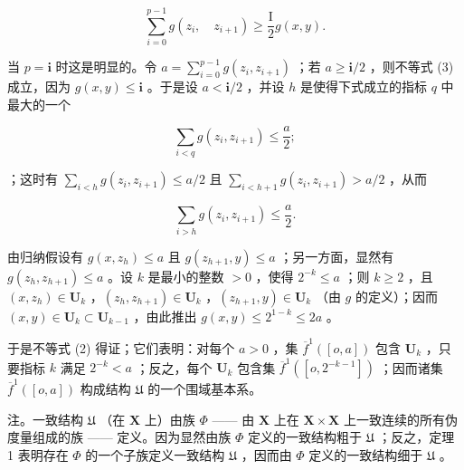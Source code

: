 \[
\sum_ {i = 0} ^ {p - 1} g (z _ {i}, \quad z _ {i + 1}) \geqslant \frac {\mathrm{I}}{2} g (x, y).\tag{3}
\]

当 \(p = \mathbf{i}\) 时这是明显的。令 \(a = \sum_{i=0}^{p-1} g(z_i, z_{i+1})\) ；若 \(a \geqslant \mathbf{i}/2\) ，则不等式 (3) 成立，因为 \(g(x, y) \leqslant \mathbf{i}\) 。于是设 \(a < \mathbf{i}/2\) ，并设 \(h\) 是使得下式成立的指标 \(q\) 中最大的一个

\[
\sum_ {i <   q} g (z _ {i}, z _ {i + 1}) \leqslant \frac {a}{2};
\]

；这时有 \(\sum_{i < h} g(z_i, z_{i+1}) \leqslant a/2\) 且 \(\sum_{i < h+1} g(z_i, z_{i+1}) > a/2\) ，从而

\[
\sum_ {i > h} g (z _ {i}, z _ {i + 1}) \leqslant \frac {a}{2}.
\]

由归纳假设有 \(g(x, z_h) \leqslant a\) 且 \(g(z_{h+1}, y) \leqslant a\) ；另一方面，显然有 \(g(z_h, z_{h+1}) \leqslant a\) 。设 \(k\) 是最小的整数 \(> 0\) ，使得 \(2^{-k} \leqslant a\) ；则 \(k \geqslant 2\) ，且 \((x, z_h) \in \mathbf{U}_k\) ，\((z_h, z_{h+1}) \in \mathbf{U}_k\) ，\((z_{h+1}, y) \in \mathbf{U}_k\) （由 \(g\) 的定义）；因而 \((x, y) \in \mathbf{U}_k \subset \mathbf{U}_{k-1}\) ，由此推出 \(g(x, y) \leqslant 2^{1-k} \leqslant 2a\) 。

于是不等式 (2) 得证；它们表明：对每个 \(a > 0\) ，集 \(\overline{f}^{1}([o, a])\) 包含 \(\mathbf{U}_{k}\) ，只要指标 \(k\) 满足 \(2^{-k} < a\) ；反之，每个 \(\mathbf{U}_{k}\) 包含集 \(\overline{f}^{1}([o, 2^{-k-1}])\) ；因而诸集 \(\overline{f}^{1}([o, a])\) 构成结构 \(\mathfrak{U}\) 的一个围域基本系。

注。一致结构 \(\mathfrak{U}\) （在 \(\mathbf{X}\) 上）由族 \(\Phi\) —— 由 \(\mathbf{X}\) 上在 \(\mathbf{X} \times \mathbf{X}\) 上一致连续的所有伪度量组成的族 —— 定义。因为显然由族 \(\Phi\) 定义的一致结构粗于 \(\mathfrak{U}\) ；反之，定理 1 表明存在 \(\Phi\) 的一个子族定义一致结构 \(\mathfrak{U}\) ，因而由 \(\Phi\) 定义的一致结构细于 \(\mathfrak{U}\) 。

